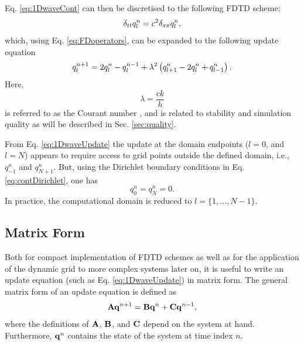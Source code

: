 \documentclass[fleqn]{jaes}
\begin{document}
Eq. \eqref{eq:1DwaveCont} can then be discretised to the following FDTD scheme:
\begin{equation}\label{eq:1dWaveDisc}
    \dtt \qln = c^2 \dxx \qln,
\end{equation}
which, using Eq. \eqref{eq:FDoperators}, can be expanded to the following update equation
\begin{equation}\label{eq:1DwaveUpdate}
    q_l^{n+1} = 2 \qln - q_l^{n-1} + \lambda^2 \left(q_{l+1}^n -2\qln + q_{l-1}^n\right).
\end{equation}
Here, 
\begin{equation}\label{eq:courant}
    \lambda = \frac{c k}{h}
\end{equation} is referred to as the Courant number \cite{Courant1928}, and is related to stability and simulation quality as will be described in Sec. \ref{sec:quality}.

From Eq. \eqref{eq:1DwaveUpdate} the update at the domain endpoints ($l=0$, and $l=N$) appears to require access to grid points outside the defined domain, i.e., $q_{-1}^n$ and $q_{N+1}^n$. But, using the Dirichlet boundary conditions in Eq. \eqref{eq:contDirichlet}, one has 
\begin{equation}\label{eq:discDirichlet}
    q_0^n = q_N^n = 0.
\end{equation}
In practice, the computational domain is reduced to $l=\{1, \hdots, N-1\}$. 

\subsection{Matrix Form}\label{sec:matrixFormOrig}
Both for compact implementation of FDTD schemes as well as for the application of the dynamic grid to more complex systems later on, it is useful to write an update equation (such as Eq. \eqref{eq:1DwaveUpdate}) in matrix form. The general matrix form of an update equation is defined as
\begin{equation}\label{eq:generalMatrixUpdate}
    \A \q^{n+1} = \B \q^n + \C \q^{n-1},
\end{equation}
where the definitions of $\mathbf{A}$, $\mathbf{B}$, and $\mathbf{C}$ depend on the system at hand. Furthermore, $\mathbf{q}^n$ contains the state of the system at time index $n$. 
\end{document}

